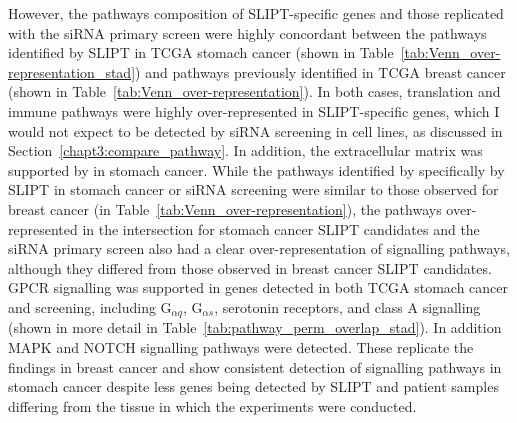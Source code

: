 However, the \glspl{pathway} composition of \gls{SLIPT}-specific genes and those replicated with the \gls{siRNA} primary screen \citep{Telford2015} were highly concordant between the \glspl{pathway} identified by \gls{SLIPT} in \gls{TCGA} stomach cancer (shown in Table~\ref{tab:Venn_over-representation_stad}) and \glspl{pathway} previously identified in \gls{TCGA} breast cancer (shown in Table~\ref{tab:Venn_over-representation}). In both cases, translation and immune \glspl{pathway} were highly over-represented in \gls{SLIPT}-specific genes, which I would not expect to be detected by \gls{siRNA} screening in cell lines, as discussed in Section~\ref{chapt3:compare_pathway}. In addition, the extracellular matrix was supported by in stomach cancer. While the \glspl{pathway} identified by specifically by \gls{SLIPT} in stomach cancer or \gls{siRNA} screening were similar to those observed for breast cancer (in Table~\ref{tab:Venn_over-representation}), the \glspl{pathway} over-represented in the intersection for stomach cancer \gls{SLIPT} candidates and the \gls{siRNA} primary screen \citep{Telford2015} also had a clear over-representation of signalling \glspl{pathway}, although they differed from those observed in breast cancer \gls{SLIPT} candidates. \gls{GPCR} signalling was supported in genes detected in both \gls{TCGA} stomach cancer and screening, including G$_{\alpha q}$, G$_{\alpha s}$, serotonin receptors, and class A signalling (shown in more detail in Table~\ref{tab:pathway_perm_overlap_stad}). In addition MAPK and NOTCH signalling \glspl{pathway} were detected. These replicate the findings in breast cancer and show consistent detection of signalling \glspl{pathway} in stomach cancer despite less genes being detected by \gls{SLIPT} and patient samples differing from the tissue in which the experiments were conducted.


